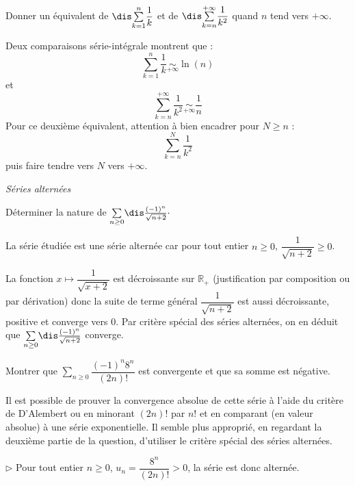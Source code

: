 \documentclass[a4paper,10pt]{report}
\newcommand{\Sum}[2]{\ensuremath{\textstyle{\sum\limits_{#1}^{#2}}}}
\begin{document}
\begin{Exercice}{}\label{harm} Donner un équivalent de $\dis \Sum{k=1}n \dfrac{1}{k}$ et de $\dis \Sum{k=n}{+ \infty} \dfrac{1}{k^2}$ quand $n$ tend vers $+ \infty$.
\end{Exercice} 

\corr Deux comparaisons série-intégrale montrent que :
$$ \sum_{k=1}^n \dfrac{1}{k} \underset{+ \infty}{\sim} \ln(n) $$
et 
$$ \sum_{k=n}^{+ \infty} \dfrac{1}{k^2} \underset{+ \infty}{\sim} \dfrac{1}{n} $$
Pour ce deuxième équivalent, attention à bien encadrer pour $N \geq n$ :
$$ \sum_{k=n}^N \dfrac{1}{k^2}$$
puis faire tendre vers $N$ vers $+ \infty$.

\medskip

\begin{center}
\textit{{ {\large Séries alternées}}}
\end{center}

\medskip

\begin{Exercice}{} Déterminer la nature de $\Sum{n \geq 0}{} \dis\frac{(-1)^n}{\sqrt{n+2}}\cdot$
\end{Exercice}

\corr La série étudiée est une série alternée car pour tout entier $n \geq 0$, $\dfrac{1}{\sqrt{n+2}} \geq 0$.


\noindent La fonction $x \mapsto \dfrac{1}{\sqrt{x+2}}$ est décroissante sur $\mathbb{R}_+$ (justification par composition ou par dérivation) donc la suite de terme général $\dfrac{1}{\sqrt{n+2}}$ est aussi décroissante, positive et converge vers $0$. Par critère spécial des séries alternées, on en déduit que $\Sum{n \geq 0}{} \dis\frac{(-1)^n}{\sqrt{n+2}}$ converge.

\medskip

\begin{Exercice}{} Montrer que $\Sum{n \geq 0}{} {\dfrac{( - 1)^n 8^n}{(2n)!}}$ est convergente et que sa somme est négative. \end{Exercice}

\corr Il est possible de prouver la convergence absolue de cette série à l'aide du critère de D'Alembert ou en minorant $(2n)!$ par $n!$ et en comparant (en valeur absolue) à une série exponentielle. Il semble plus approprié, en regardant la deuxième partie de la question, d'utiliser le critère spécial des séries alternées.

\medskip

\noindent $\rhd$ Pour tout entier $n \geq 0$, $u_n = \dfrac{ 8^n}{(2n)!} > 0$, la série est donc alternée. 
\end{document}
